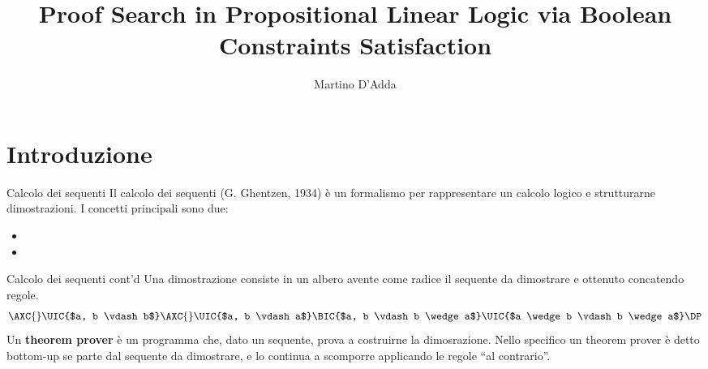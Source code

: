 \documentclass{beamer}
\title{Proof Search in Propositional Linear Logic via Boolean Constraints Satisfaction}
\author{Martino D'Adda}
\begin{document}
\maketitle


\section{Introduzione}
\begin{frame}{Calcolo dei sequenti}
	Il calcolo dei sequenti (G. Ghentzen, 1934) è un formalismo per rappresentare un calcolo logico e strutturarne dimostrazioni.
	I concetti principali sono due:
	\begin{itemize}
		\item {}
		\item {}
	\end{itemize}
\end{frame}

\begin{frame}{Calcolo dei sequenti cont'd}
	Una dimostrazione consiste in un albero avente come radice il sequente da dimostrare e ottenuto concatendo regole.
	$$
	\AXC{}
	\LeftLabel{$A$}
	\UIC{$a, b \vdash b$}
	\AXC{}
	\LeftLabel{$A$}
	\UIC{$a, b \vdash a$}
	\LeftLabel{$\wedge_R$}
	\BIC{$a, b \vdash b \wedge a$}
	\LeftLabel{$\wedge_L$}
	\UIC{$a \wedge b \vdash b \wedge a$}
	\DP
	$$
	Un \textbf{theorem prover} è un programma che, dato un sequente, prova a costruirne la dimosrazione.
	Nello specifico un theorem prover è detto bottom-up se parte dal sequente da dimostrare, e lo continua a scomporre applicando le regole ``al contrario''.
\end{frame}
\end{document}
